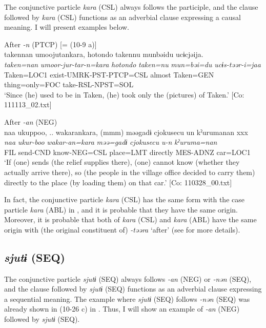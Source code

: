 \begin{xlist}
The conjunctive particle \textit{kara} (CSL) always follows the participle, and the clause followed by \textit{kara} (CSL) functions as an adverbial clause expressing a causal meaning. I will present examples below.

\ea\label{ex:10.34}  
\ea After \textit{{}-n} (PTCP) [= (10-9 a)]\\
      \glll    takennan  umoojutankara,  {\textbar}hotondo{\textbar}  takennu   munbəidu  ucɨcjəija.\\
    \textit{taken=nan}  \textit{umoor-jur-tar-n=kara}  \textit{hotondo}  \textit{taken=nu}  \textit{mun=bəi=du}  \textit{ucɨs-təər-i=jaa}\\
    Taken=LOC1  exist-UMRK-PST-PTCP=CSL  almost  Taken=GEN   thing=only=FOC  take-RSL-NPST=SOL\\
\glt     ‘Since (he) used to be in Taken, (he) took only the (pictures) of Taken.’  [Co: 111113\_02.txt]

\ex After \textit{{}-an} (NEG)\\
      \glll    naa  ukuppoo, ..  wakarankara,  (mmm)  məəgadɨ  {\textbar}cjokusecu{\textbar} un  kˀurumanan  xxx\\
    \textit{naa}  \textit{ukur-boo}  \textit{wakar-an=kara}    \textit{məə=gadɨ}  \textit{cjokusecu}    \textit{u-n}  \textit{kˀuruma=nan}  \\
    FIL  send-CND  know-NEG=CSL    place=LMT  directly   MES-ADNZ  car=LOC1  \\
\glt     ‘If (one) sends (the relief supplies there), (one) cannot know (whether they actually arrive there), so (the people in the village office decided to carry them) directly to the place (by loading them) on that car.’  [Co: 110328\_00.txt]
\z
\z

  In fact, the conjunctive particle \textit{kara} (CSL) has the same form with the case particle \textit{kara} (ABL) in , and it is probable that they have the same origin. Moreover, it is probable that both of \textit{kara} (CSL) and \textit{kara} (ABL) have the same origin with (the original constituent of) \textit{{}-təəra} ‘after’ (see  for more details).

\subsection{\textit{sjutɨ} (SEQ)}\label{sec:10.2.4}

The conjunctive particle \textit{sjutɨ} (SEQ) always follows \textit{{}-an} (NEG) or \textit{{}-nən} (SEQ), and the clause followed by \textit{sjutɨ} (SEQ) functions as an adverbial clause expressing a sequential meaning. The example where \textit{sjutɨ} (SEQ) follows \textit{{}-nən} (SEQ) was already shown in (10-26 c) in . Thus, I will show an example of \textit{{}-an} (NEG) followed by \textit{sjutɨ} (SEQ).


\end{xlist}
